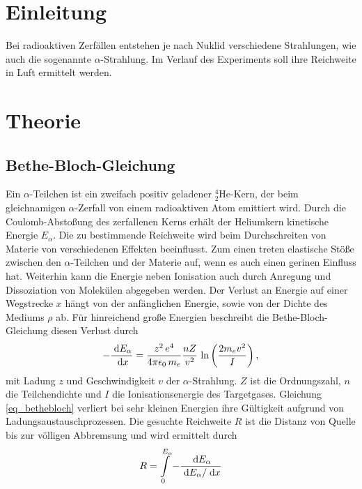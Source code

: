 
\section{Einleitung}				%
\setcounter{page}{1}
Bei radioaktiven Zerfällen entstehen je nach Nuklid verschiedene Strahlungen, wie auch die sogenannte $\alpha$-Strahlung. Im Verlauf
des Experiments soll ihre Reichweite in Luft ermittelt werden.
\section{Theorie}
\subsection{Bethe-Bloch-Gleichung}
Ein $\alpha$-Teilchen ist ein zweifach positiv geladener $^4_2$He-Kern, der beim gleichnamigen $\alpha$-Zerfall von einem radioaktiven
Atom emittiert wird. Durch die Coulomb-Abstoßung des zerfallenen Kerns erhält der Heliumkern kinetische Energie $E_\alpha$. Die zu bestimmende
Reichweite wird beim Durchschreiten von Materie von verschiedenen Effekten beeinflusst. Zum einen treten elastische Stöße zwischen den
$\alpha$-Teilchen und der Materie auf, wenn es auch einen gerinen Einfluss hat. Weiterhin kann die Energie neben Ionisation auch durch
Anregung und Dissoziation von Molekülen abgegeben werden. Der Verlust an Energie auf einer Wegstrecke $x$ hängt von der anfänglichen
Energie, sowie von der Dichte des Mediums $\rho$ ab. Für hinreichend große Energien beschreibt die Bethe-Bloch-Gleichung diesen Verlust
durch
\begin{align}
 -\frac{\; \mathrm{d} E_\alpha}{\; \mathrm{d} x} = \frac{z^2 \, e^4}{4 \pi \epsilon_0 \,m_e} \frac{nZ}{v^2}\, \ln \left(\frac{2 m_e v^2}{I}\right),
 \label{eq_bethebloch}
\end{align}
mit Ladung $z$ und Geschwindigkeit $v$ der $\alpha$-Strahlung. $Z$ ist die Ordnungszahl, $n$ die Teilchendichte und $I$ die Ionisationsenergie
des Targetgases. Gleichung \eqref{eq_bethebloch} verliert bei sehr kleinen Energien ihre Gültigkeit aufgrund von Ladungsaustauschprozessen.
Die gesuchte Reichweite $R$ ist die Distanz von Quelle bis zur völligen Abbremsung und wird ermittelt durch
\begin{align}
 R = \int\limits_0^{E_\alpha} -\frac{\; \mathrm{d} E_\alpha}{\; \mathrm{d} E_\alpha / \; \mathrm{d} x}
 \label{eq_reichweite_integral}
\end{align}

